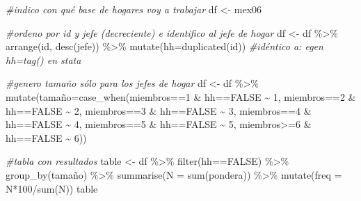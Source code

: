 \documentclass[
]{book}
\newenvironment{Shaded}{\begin{snugshade}}{\end{snugshade}}
\newcommand{\AttributeTok}[1]{\textcolor[rgb]{0.77,0.63,0.00}{#1}}
\newcommand{\CommentTok}[1]{\textcolor[rgb]{0.56,0.35,0.01}{\textit{#1}}}
\newcommand{\ConstantTok}[1]{\textcolor[rgb]{0.00,0.00,0.00}{#1}}
\newcommand{\DecValTok}[1]{\textcolor[rgb]{0.00,0.00,0.81}{#1}}
\newcommand{\FunctionTok}[1]{\textcolor[rgb]{0.00,0.00,0.00}{#1}}
\newcommand{\NormalTok}[1]{#1}
\newcommand{\OtherTok}[1]{\textcolor[rgb]{0.56,0.35,0.01}{#1}}
\newcommand{\SpecialCharTok}[1]{\textcolor[rgb]{0.00,0.00,0.00}{#1}}
\begin{document}
\begin{Shaded}
\begin{Highlighting}[]
\CommentTok{\#indico con qué base de hogares voy a trabajar}
\NormalTok{df }\OtherTok{\textless{}{-}}\NormalTok{ mex06 }

\CommentTok{\#ordeno por id y jefe (decreciente) e identifico al jefe de hogar}
\NormalTok{df }\OtherTok{\textless{}{-}}\NormalTok{ df }\SpecialCharTok{\%\textgreater{}\%} \FunctionTok{arrange}\NormalTok{(id, }\FunctionTok{desc}\NormalTok{(jefe)) }\SpecialCharTok{\%\textgreater{}\%}
          \FunctionTok{mutate}\NormalTok{(}\AttributeTok{hh=}\FunctionTok{duplicated}\NormalTok{(id))      }\CommentTok{\#idéntico a: egen hh=tag() en stata}

\CommentTok{\#genero tamaño sólo para los jefes de hogar}
\NormalTok{df }\OtherTok{\textless{}{-}}\NormalTok{ df }\SpecialCharTok{\%\textgreater{}\%} \FunctionTok{mutate}\NormalTok{(tamaño}\OtherTok{=}\FunctionTok{case\_when}\NormalTok{(miembros}\SpecialCharTok{==}\DecValTok{1} \SpecialCharTok{\&}\NormalTok{ hh}\SpecialCharTok{==}\ConstantTok{FALSE} \SpecialCharTok{\textasciitilde{}} \DecValTok{1}\NormalTok{,}
\NormalTok{                                     miembros}\SpecialCharTok{==}\DecValTok{2} \SpecialCharTok{\&}\NormalTok{ hh}\SpecialCharTok{==}\ConstantTok{FALSE} \SpecialCharTok{\textasciitilde{}} \DecValTok{2}\NormalTok{,}
\NormalTok{                                     miembros}\SpecialCharTok{==}\DecValTok{3} \SpecialCharTok{\&}\NormalTok{ hh}\SpecialCharTok{==}\ConstantTok{FALSE} \SpecialCharTok{\textasciitilde{}} \DecValTok{3}\NormalTok{,}
\NormalTok{                                     miembros}\SpecialCharTok{==}\DecValTok{4} \SpecialCharTok{\&}\NormalTok{ hh}\SpecialCharTok{==}\ConstantTok{FALSE} \SpecialCharTok{\textasciitilde{}} \DecValTok{4}\NormalTok{,}
\NormalTok{                                     miembros}\SpecialCharTok{==}\DecValTok{5} \SpecialCharTok{\&}\NormalTok{ hh}\SpecialCharTok{==}\ConstantTok{FALSE} \SpecialCharTok{\textasciitilde{}} \DecValTok{5}\NormalTok{,}
\NormalTok{                                     miembros}\SpecialCharTok{\textgreater{}=}\DecValTok{6} \SpecialCharTok{\&}\NormalTok{ hh}\SpecialCharTok{==}\ConstantTok{FALSE} \SpecialCharTok{\textasciitilde{}} \DecValTok{6}\NormalTok{))}

\CommentTok{\#tabla con resultados}
\NormalTok{table }\OtherTok{\textless{}{-}}\NormalTok{ df }\SpecialCharTok{\%\textgreater{}\%} \FunctionTok{filter}\NormalTok{(hh}\SpecialCharTok{==}\ConstantTok{FALSE}\NormalTok{) }\SpecialCharTok{\%\textgreater{}\%} \FunctionTok{group\_by}\NormalTok{(tamaño) }\SpecialCharTok{\%\textgreater{}\%} \FunctionTok{summarise}\NormalTok{(}\AttributeTok{N =} \FunctionTok{sum}\NormalTok{(pondera)) }\SpecialCharTok{\%\textgreater{}\%} 
                                                           \FunctionTok{mutate}\NormalTok{(}\AttributeTok{freq =}\NormalTok{ N}\SpecialCharTok{*}\DecValTok{100}\SpecialCharTok{/}\FunctionTok{sum}\NormalTok{(N))}
\NormalTok{table}
\end{Highlighting}
\end{Shaded}
\end{document}
